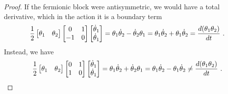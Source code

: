 \begin{proof}
        If the fermionic block were antisymmetric, we would have a total derivative, which in the action it is a boundary term
        \begin{equation*}
            \frac{1}{2} \begin{bmatrix} \theta_1 & \theta_2 \end{bmatrix} \begin{bmatrix}
                0 & 1 \\ -1 & 0
            \end{bmatrix} \begin{bmatrix} \dot \theta_1 \\ \dot \theta_1 \end{bmatrix} = \theta_1 \dot \theta_2 - \dot \theta_2 \theta_1 = \theta_1 \dot \theta_2 + \theta_1 \dot \theta_2 = \frac{d(\theta_1 \theta_2)}{dt} ~.
        \end{equation*}
        Instead, we have
        \begin{equation*}
            \frac{1}{2} \begin{bmatrix} \theta_1 & \theta_2 \end{bmatrix} \begin{bmatrix}
                0 & 1 \\ 1 & 0
            \end{bmatrix} \begin{bmatrix} \dot \theta_1 \\ \dot \theta_1 \end{bmatrix} = \theta_1 \dot \theta_2 + \dot \theta_2 \theta_1 = \theta_1 \dot \theta_2 - \theta_1 \dot \theta_2 \neq \frac{d(\theta_1 \theta_2)}{dt} ~.
        \end{equation*}
    \end{proof}

